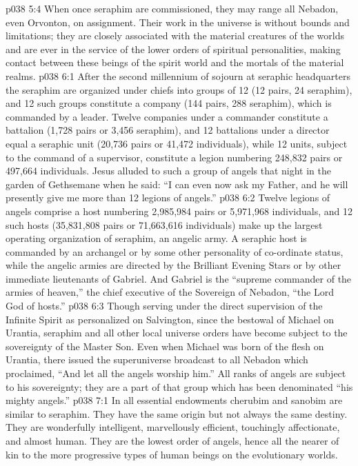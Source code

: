 \vs p038 5:4 When once seraphim are commissioned, they may range all Nebadon, even Orvonton, on assignment. Their work in the universe is without bounds and limitations; they are closely associated with the material creatures of the worlds and are ever in the service of the lower orders of spiritual personalities, making contact between these beings of the spirit world and the mortals of the material realms.
\vs p038 6:1 After the second millennium of sojourn at seraphic headquarters the seraphim are organized under chiefs into groups of 12 (12 pairs, 24 seraphim), and 12 such groups constitute a company (144 pairs, 288 seraphim), which is commanded by a leader. Twelve companies under a commander constitute a battalion (1,728 pairs or 3,456 seraphim), and 12 battalions under a director equal a seraphic unit (20,736 pairs or 41,472 individuals), while 12 units, subject to the command of a supervisor, constitute a legion numbering 248,832 pairs or 497,664 individuals. Jesus alluded to such a group of angels that night in the garden of Gethsemane when he said: “I can even now ask my Father, and he will presently give me more than 12 legions of angels.”
\vs p038 6:2 Twelve legions of angels comprise a host numbering 2,985,984 pairs or 5,971,968 individuals, and 12 such hosts (35,831,808 pairs or 71,663,616 individuals) make up the largest operating organization of seraphim, an angelic army. A seraphic host is commanded by an archangel or by some other personality of co\hyp{}ordinate status, while the angelic armies are directed by the Brilliant Evening Stars or by other immediate lieutenants of Gabriel. And Gabriel is the “supreme commander of the armies of heaven,” the chief executive of the Sovereign of Nebadon, “the Lord God of hosts.”
\vs p038 6:3 Though serving under the direct supervision of the Infinite Spirit as personalized on Salvington, since the bestowal of Michael on Urantia, seraphim and all other local universe orders have become subject to the sovereignty of the Master Son. Even when Michael was born of the flesh on Urantia, there issued the superuniverse broadcast to all Nebadon which proclaimed, “And let all the angels worship him.” All ranks of angels are subject to his sovereignty; they are a part of that group which has been denominated “his mighty angels.”
\vs p038 7:1 In all essential endowments cherubim and sanobim are similar to seraphim. They have the same origin but not always the same destiny. They are wonderfully intelligent, marvellously efficient, touchingly affectionate, and almost human. They are the lowest order of angels, hence all the nearer of kin to the more progressive types of human beings on the evolutionary worlds.
